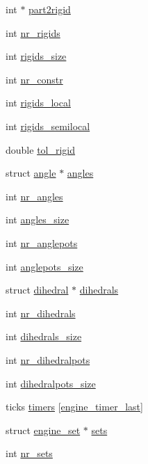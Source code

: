 \begin{DoxyCompactItemize}
\item 
int $\ast$ \hyperlink{structengine_a448d9f7a86161fe9934ccb854577b2ba}{part2rigid}
\item 
int \hyperlink{structengine_a9322f4e10554dfb5722aaab9d8b265e9}{nr\-\_\-rigids}
\item 
int \hyperlink{structengine_ae5cb986dfb738c34c591a315301fd893}{rigids\-\_\-size}
\item 
int \hyperlink{structengine_a3016fd6c2bac51bd377ee1f3c1d1928b}{nr\-\_\-constr}
\item 
int \hyperlink{structengine_a7f84bbfd25fea51dd4e013d3a37852bc}{rigids\-\_\-local}
\item 
int \hyperlink{structengine_a479a52cfdd56b4ea6b5787215382ba98}{rigids\-\_\-semilocal}
\item 
double \hyperlink{structengine_a5d4ff08ea8e350214c1a46663b229500}{tol\-\_\-rigid}
\item 
struct \hyperlink{structangle}{angle} $\ast$ \hyperlink{structengine_ab28bf1df3e6849a71e5d02f6ddfab24e}{angles}
\item 
int \hyperlink{structengine_a03b0ba344cd1442d3d3975774eeea3e9}{nr\-\_\-angles}
\item 
int \hyperlink{structengine_aa888783007ffcf01a85b0e529b081c11}{angles\-\_\-size}
\item 
int \hyperlink{structengine_ad4840b796f70975b11dee781cb07da7e}{nr\-\_\-anglepots}
\item 
int \hyperlink{structengine_a08e34a86b30f21972c7d2229b38ff042}{anglepots\-\_\-size}
\item 
struct \hyperlink{structdihedral}{dihedral} $\ast$ \hyperlink{structengine_a069ad44663915a13f48a413d6edacee9}{dihedrals}
\item 
int \hyperlink{structengine_a3ec4bdb694eae0871b24da3bc151294c}{nr\-\_\-dihedrals}
\item 
int \hyperlink{structengine_aa672b72c2af111a06d1f0ec88824e4ab}{dihedrals\-\_\-size}
\item 
int \hyperlink{structengine_acecc3256a1ab9c788c0d418686ccd14c}{nr\-\_\-dihedralpots}
\item 
int \hyperlink{structengine_a452fe646d97bfb1d8faf33c77c8e84a4}{dihedralpots\-\_\-size}
\item 
ticks \hyperlink{structengine_ab82bc5d54d6f200a605c3aace671671c}{timers} \mbox{[}\hyperlink{engine_8h_a06fc87d81c62e9abb8790b6e5713c55ba193f5be157573b064ca69240a194d5e1}{engine\-\_\-timer\-\_\-last}\mbox{]}
\item 
struct \hyperlink{structengine__set}{engine\-\_\-set} $\ast$ \hyperlink{structengine_a5eab4a887e3d36026b70dd4e4e372630}{sets}
\item 
int \hyperlink{structengine_a8c0471ad6cf64a6a06fadd14ed2629e1}{nr\-\_\-sets}
\end{DoxyCompactItemize}



